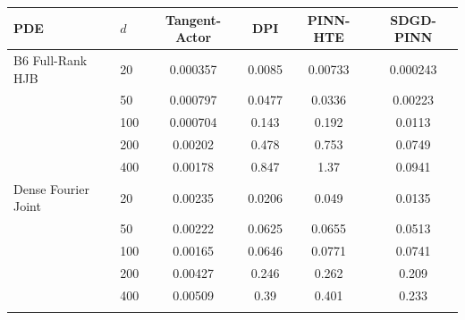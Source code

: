 \begin{tabular}{llcccc}
\toprule
PDE & $d$ & Tangent-Actor & DPI & PINN-HTE & SDGD-PINN \\
\midrule
B6 Full-Rank HJB & 20 & 0.000357 & 0.0085 & 0.00733 & 0.000243 \\
 & 50 & 0.000797 & 0.0477 & 0.0336 & 0.00223 \\
 & 100 & 0.000704 & 0.143 & 0.192 & 0.0113 \\
 & 200 & 0.00202 & 0.478 & 0.753 & 0.0749 \\
 & 400 & 0.00178 & 0.847 & 1.37 & 0.0941 \\
\addlinespace
Dense Fourier Joint & 20 & 0.00235 & 0.0206 & 0.049 & 0.0135 \\
 & 50 & 0.00222 & 0.0625 & 0.0655 & 0.0513 \\
 & 100 & 0.00165 & 0.0646 & 0.0771 & 0.0741 \\
 & 200 & 0.00427 & 0.246 & 0.262 & 0.209 \\
 & 400 & 0.00509 & 0.39 & 0.401 & 0.233 \\
\addlinespace
\bottomrule
\end{tabular}
